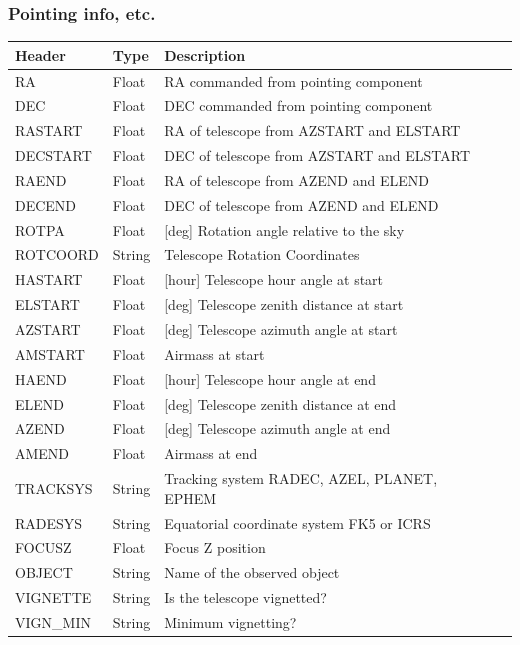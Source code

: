 \subsubsection{Pointing info, etc.}
\begin{tabular}{l l l l l}

\hline
Header & Type & Description \\
\hline
RA & Float & RA commanded from pointing component \\
DEC & Float & DEC commanded from pointing component \\
RASTART & Float & RA of telescope from AZSTART and ELSTART \\
DECSTART & Float & DEC of telescope from AZSTART and ELSTART \\
RAEND & Float & RA of telescope from AZEND and ELEND \\
DECEND & Float & DEC of telescope from AZEND and ELEND \\
ROTPA & Float & [deg] Rotation angle relative to the sky \\
ROTCOORD & String & Telescope Rotation Coordinates \\
HASTART & Float & [hour] Telescope hour angle at start \\
ELSTART & Float & [deg] Telescope zenith distance at start \\
AZSTART & Float & [deg] Telescope azimuth angle at start \\
AMSTART & Float & Airmass at start \\
HAEND & Float & [hour] Telescope hour angle at end \\
ELEND & Float & [deg] Telescope zenith distance at end \\
AZEND & Float & [deg] Telescope azimuth angle at end \\
AMEND & Float & Airmass at end \\
TRACKSYS & String & Tracking system RADEC, AZEL, PLANET, EPHEM \\
RADESYS & String & Equatorial coordinate system FK5 or ICRS \\
FOCUSZ & Float & Focus Z position \\
OBJECT & String & Name of the observed object \\
VIGNETTE & String & Is the telescope vignetted? \\
VIGN\_MIN & String & Minimum vignetting? \\
\hline
\end{tabular}


